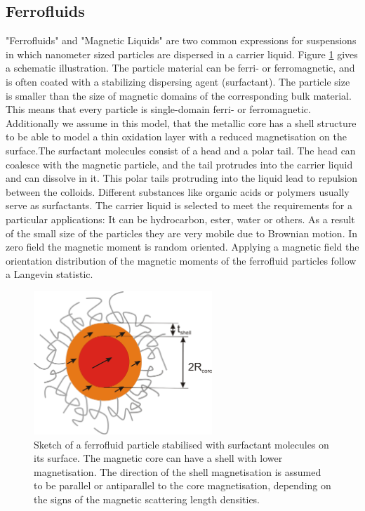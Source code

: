 \clearpage
\subsection{Ferrofluids} \hspace{1pt}
\label{sec:ferrofluid}

"Ferrofluids" and "Magnetic Liquids" are two common expressions for
suspensions in which nanometer sized particles are dispersed in a
carrier liquid. Figure \ref{fig:ferrofluidparticle} gives a
schematic illustration. The particle material can be ferri- or
ferromagnetic, and is often coated with a stabilizing dispersing
agent (surfactant). The particle size is smaller than the size of
magnetic domains of the corresponding bulk material. This means that
every particle is single-domain ferri- or ferromagnetic.
Additionally we assume in this model, that the metallic core has a
shell structure to be able to model a thin oxidation layer with a
reduced magnetisation on the surface.The surfactant molecules
consist of a head and a polar tail. The head can coalesce with the
magnetic particle, and the tail protrudes into the carrier liquid
and can dissolve in it. This polar tails protruding into the liquid
lead to repulsion between the colloids. Different substances like
organic acids or polymers usually serve as surfactants. The carrier
liquid is selected to meet the requirements for a particular
applications: It can be hydrocarbon, ester, water or others. As a
result of the small size of the particles they are very mobile due
to Brownian motion. In zero field the magnetic moment is random
oriented. Applying a magnetic field the orientation distribution of
the magnetic moments of the ferrofluid particles follow a Langevin
statistic.

\begin{figure}[htb]
\begin{center}
\includegraphics[width=0.6\textwidth]{../images/form_factor/ferrofluid/ferrfluidparticle.png}
\end{center}
\caption{Sketch of a ferrofluid particle stabilised with surfactant
molecules on its surface. The magnetic core can have a shell with
lower magnetisation. The direction of the shell magnetisation is
assumed to be parallel or antiparallel to the core magnetisation,
depending on the signs of the magnetic scattering length densities.}
\label{fig:ferrofluidparticle}
\end{figure}

